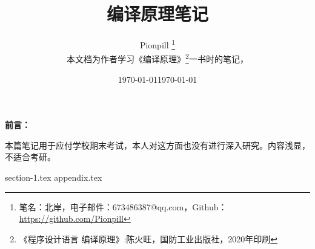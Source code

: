 \documentclass{PionpillNote-art}
\title{编译原理笔记}
\author{
    Pionpill \footnote{笔名：北岸，电子邮件：673486387@qq.com，Github：\url{https://github.com/Pionpill}} \\
    本文档为作者学习《编译原理》\footnote{《程序设计语言 编译原理》:陈火旺，国防工业出版社，2020年印刷}一书时的笔记，\\
}
\date{\today}
\begin{document}
\maketitle

\noindent\textbf{前言：}

本篇笔记用于应付学校期末考试，本人对这方面也没有进行深入研究。内容浅显，不适合考研。

\date{\today}

\tableofcontents
\thispagestyle{empty}
\newpage
\setcounter{page}{1} 

{section-1.tex}
{appendix.tex}
\end{document}
